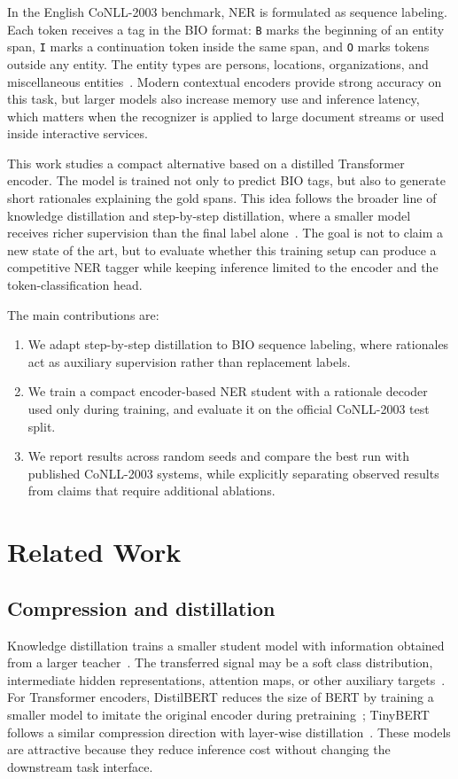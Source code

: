 \documentclass[a4paper,12pt]{extarticle}
\begin{document}
In the English CoNLL-2003 benchmark, NER is formulated as sequence labeling. Each token receives a tag in the BIO format: \texttt{B} marks the beginning of an entity span, \texttt{I} marks a continuation token inside the same span, and \texttt{O} marks tokens outside any entity. The entity types are persons, locations, organizations, and miscellaneous entities~\cite{tjong2003introduction}. Modern contextual encoders provide strong accuracy on this task, but larger models also increase memory use and inference latency, which matters when the recognizer is applied to large document streams or used inside interactive services.

This work studies a compact alternative based on a distilled Transformer encoder. The model is trained not only to predict BIO tags, but also to generate short rationales explaining the gold spans. This idea follows the broader line of knowledge distillation and step-by-step distillation, where a smaller model receives richer supervision than the final label alone~\cite{hinton2015distilling,hsieh2023distilling}. The goal is not to claim a new state of the art, but to evaluate whether this training setup can produce a competitive NER tagger while keeping inference limited to the encoder and the token-classification head.

The main contributions are:
\begin{enumerate}
    \item We adapt step-by-step distillation to BIO sequence labeling, where rationales act as auxiliary supervision rather than replacement labels.
    \item We train a compact encoder-based NER student with a rationale decoder used only during training, and evaluate it on the official CoNLL-2003 test split.
    \item We report results across random seeds and compare the best run with published CoNLL-2003 systems, while explicitly separating observed results from claims that require additional ablations.
\end{enumerate}

\section{Related Work}
\label{sec:related}

\subsection{Compression and distillation}
Knowledge distillation trains a smaller student model with information obtained from a larger teacher~\cite{hinton2015distilling}. The transferred signal may be a soft class distribution, intermediate hidden representations, attention maps, or other auxiliary targets~\cite{romero2014fitnets,heo2019knowledge}. For Transformer encoders, DistilBERT reduces the size of BERT by training a smaller model to imitate the original encoder during pretraining~\cite{sanh2019distilbert}; TinyBERT follows a similar compression direction with layer-wise distillation~\cite{jiao2019tinybert}. These models are attractive because they reduce inference cost without changing the downstream task interface.
\end{document}
